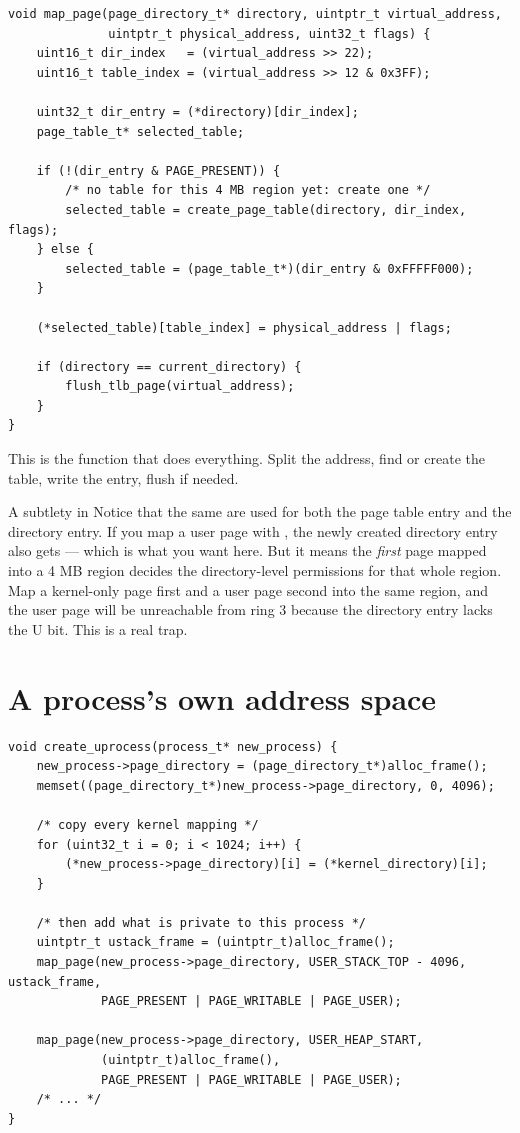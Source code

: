 \begin{lstlisting}[style=c]
void map_page(page_directory_t* directory, uintptr_t virtual_address,
              uintptr_t physical_address, uint32_t flags) {
    uint16_t dir_index   = (virtual_address >> 22);
    uint16_t table_index = (virtual_address >> 12 & 0x3FF);

    uint32_t dir_entry = (*directory)[dir_index];
    page_table_t* selected_table;

    if (!(dir_entry & PAGE_PRESENT)) {
        /* no table for this 4 MB region yet: create one */
        selected_table = create_page_table(directory, dir_index, flags);
    } else {
        selected_table = (page_table_t*)(dir_entry & 0xFFFFF000);
    }

    (*selected_table)[table_index] = physical_address | flags;

    if (directory == current_directory) {
        flush_tlb_page(virtual_address);
    }
}
\end{lstlisting}

This is the function that does everything. Split the address, find or create the table, write the
entry, flush if needed.

\begin{warn}{A subtlety in }
Notice that the same  are used for both the page table entry and the directory entry. If
you map a user page with , the newly created directory entry also gets
 --- which is what you want here. But it means the \emph{first} page mapped into a
4 MB region decides the directory-level permissions for that whole region. Map a kernel-only page
first and a user page second into the same region, and the user page will be unreachable from ring
3 because the directory entry lacks the U bit. This is a real trap.
\end{warn}

\section{A process's own address space}

\begin{lstlisting}[style=c]
void create_uprocess(process_t* new_process) {
    new_process->page_directory = (page_directory_t*)alloc_frame();
    memset((page_directory_t*)new_process->page_directory, 0, 4096);

    /* copy every kernel mapping */
    for (uint32_t i = 0; i < 1024; i++) {
        (*new_process->page_directory)[i] = (*kernel_directory)[i];
    }

    /* then add what is private to this process */
    uintptr_t ustack_frame = (uintptr_t)alloc_frame();
    map_page(new_process->page_directory, USER_STACK_TOP - 4096, ustack_frame,
             PAGE_PRESENT | PAGE_WRITABLE | PAGE_USER);

    map_page(new_process->page_directory, USER_HEAP_START,
             (uintptr_t)alloc_frame(),
             PAGE_PRESENT | PAGE_WRITABLE | PAGE_USER);
    /* ... */
}
\end{lstlisting}

